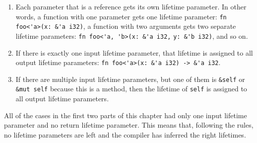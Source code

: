 \begin{enumerate}[noitemsep]
    \item Each parameter that is a reference gets its own lifetime parameter. In other words, a function with one parameter gets one lifetime parameter: \verb|fn foo<'a>(x: &'a i32)|, a function with two arguments gets two separate lifetime parameters: \verb|fn foo<'a, 'b>(x: &'a i32,| \verb|y: &'b i32)|, and so on.
\item If there is exactly one input lifetime parameter, that lifetime is assigned to all output lifetime parameters: \verb|fn foo<'a>(x: &'a i32) -> &'a i32|.
\item If there are multiple input lifetime parameters, but one of them is \verb|&self| or \verb|&mut self| because this is a method, then the lifetime of \verb|self| is assigned to all output lifetime parameters.
\end{enumerate}

All of the cases in the first two parts of this chapter had only one input lifetime parameter and no return lifetime parameter. This means that, following the rules, no lifetime parameters are left and the compiler has inferred the right lifetimes. 



%    

